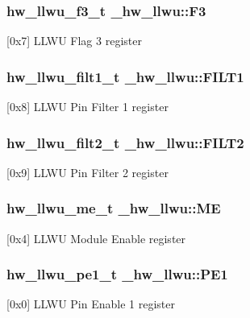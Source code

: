 \subsubsection[{\texorpdfstring{F3}{F3}}]{ {\bf hw\+\_\+llwu\+\_\+f3\+\_\+t} \+\_\+hw\+\_\+llwu\+::\+F3}\hypertarget{struct__hw__llwu_a2995519e3e570ce0e7dd4dc8c9cf09f8}{}\label{struct__hw__llwu_a2995519e3e570ce0e7dd4dc8c9cf09f8}
\mbox{[}0x7\mbox{]} L\+L\+WU Flag 3 register 
\subsubsection[{\texorpdfstring{F\+I\+L\+T1}{FILT1}}]{ {\bf hw\+\_\+llwu\+\_\+filt1\+\_\+t} \+\_\+hw\+\_\+llwu\+::\+F\+I\+L\+T1}\hypertarget{struct__hw__llwu_a5836bdd72737ae9f62d0ef81ff0409a0}{}\label{struct__hw__llwu_a5836bdd72737ae9f62d0ef81ff0409a0}
\mbox{[}0x8\mbox{]} L\+L\+WU Pin Filter 1 register 
\subsubsection[{\texorpdfstring{F\+I\+L\+T2}{FILT2}}]{ {\bf hw\+\_\+llwu\+\_\+filt2\+\_\+t} \+\_\+hw\+\_\+llwu\+::\+F\+I\+L\+T2}\hypertarget{struct__hw__llwu_ac3e9a2961f137ca9b99f64cc2ff27a58}{}\label{struct__hw__llwu_ac3e9a2961f137ca9b99f64cc2ff27a58}
\mbox{[}0x9\mbox{]} L\+L\+WU Pin Filter 2 register 
\subsubsection[{\texorpdfstring{ME}{ME}}]{ {\bf hw\+\_\+llwu\+\_\+me\+\_\+t} \+\_\+hw\+\_\+llwu\+::\+ME}\hypertarget{struct__hw__llwu_afca5cd2cbba10399297253ca2a5dfd0c}{}\label{struct__hw__llwu_afca5cd2cbba10399297253ca2a5dfd0c}
\mbox{[}0x4\mbox{]} L\+L\+WU Module Enable register 
\subsubsection[{\texorpdfstring{P\+E1}{PE1}}]{ {\bf hw\+\_\+llwu\+\_\+pe1\+\_\+t} \+\_\+hw\+\_\+llwu\+::\+P\+E1}\hypertarget{struct__hw__llwu_a919d3c299fbf9a369c323e66f0baf353}{}\label{struct__hw__llwu_a919d3c299fbf9a369c323e66f0baf353}
\mbox{[}0x0\mbox{]} L\+L\+WU Pin Enable 1 register 
